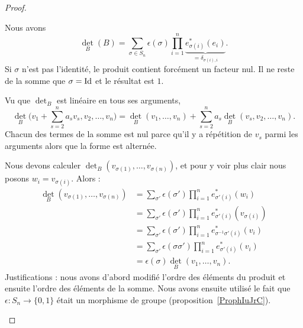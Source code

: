 \begin{proof}
\begin{subproof}
        \item[\ref{ITEMooNFJTooTqGoPr}]
            Nous avons
            \begin{equation}
                \det_B(B)=\sum_{\sigma\in S_n}\epsilon(\sigma)\prod_{i=1}^n\underbrace{e_{\sigma(i)}^*(e_i)}_{=\delta_{\sigma(i),i}}.
            \end{equation}
            Si \( \sigma\) n'est pas l'identité, le produit contient forcément un facteur nul. Il ne reste de la somme que \( \sigma=\operatorname{Id}\) et le résultat est \( 1\).
        \item[\ref{ITEMooALRQooDvBzDQ}]
            Vu que \( \det_B\) est linéaire en tous ses arguments,
            \begin{equation}
                \det_B\big( v_1+\sum_{s=2}^na_sv_s,v_2,\ldots, v_n \big)=\det_B(v_1,\ldots, v_n)+\sum_{s=2}^na_s\det_B(v_s,v_2,\ldots, v_n).
            \end{equation}
            Chacun des termes de la somme est nul parce qu'il y a répétition de \( v_s\) parmi les arguments alors que la forme est alternée.
        \item[\ref{ITEMooQTTRooMbzqyW}]
            Nous devons calculer \( \det_B(v_{\sigma(1)},\ldots, v_{\sigma(n)})\), et pour y voir plus clair nous posons \( w_i=v_{\sigma(i)}\). Alors :
            \begin{subequations}
                \begin{align}
                    \det_B(v_{\sigma(1)},\ldots, v_{\sigma(n)})&=\sum_{\sigma'}\epsilon(\sigma')\prod_{i=1}^ne^*_{\sigma'(i)}(w_i)\\
                    &=\sum_{\sigma'}\epsilon(\sigma')\prod_{i=1}^ne^*_{\sigma'(i)}(v_{\sigma(i)})\\
                    &=\sum_{\sigma'}\epsilon(\sigma')\prod_{i=1}^ne^*_{\sigma^{-1}\sigma'(i)}(v_i)\\
                    &=\sum_{\sigma'}\epsilon(\sigma\sigma')\prod_{i=1}^ne^*_{\sigma'(i)}(v_i)\\
                    &=\epsilon(\sigma)\det_B(v_1,\ldots, v_n).
                \end{align}
            \end{subequations}
            Justifications : nous avons d'abord modifié l'ordre des éléments du produit et ensuite l'ordre des éléments de la somme. Nous avons ensuite utilisé le fait que \( \epsilon\colon S_n\to \{ 0,1 \}\) était un morphisme de groupe (proposition~\ref{ProphIuJrC}).
        \item[\ref{ITEMooIPIDooTrerVF}]

\end{subproof}
\end{proof}
